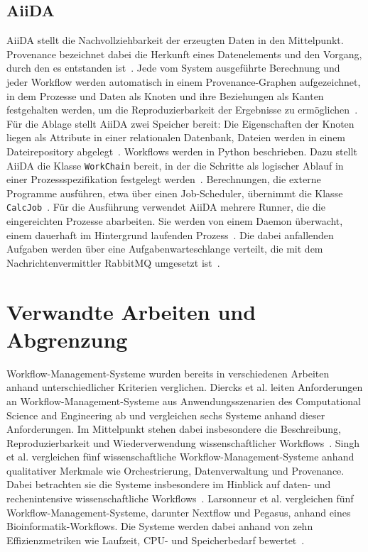 \subsection{AiiDA}
\label{sec:basics:aiida}
AiiDA stellt die Nachvollziehbarkeit der erzeugten Daten in den
Mittelpunkt. Provenance bezeichnet dabei die Herkunft eines
Datenelements und den Vorgang, durch den es entstanden
ist~\cite[S.~316]{buneman2001provenance}. Jede vom System
ausgeführte Berechnung und jeder Workflow werden automatisch in
einem Provenance-Graphen aufgezeichnet, in dem Prozesse und Daten
als Knoten und ihre Beziehungen als Kanten festgehalten werden, um
die Reproduzierbarkeit der Ergebnisse zu
ermöglichen~\cite[S.~2]{huber2020aiida}. Für die Ablage stellt
AiiDA zwei Speicher bereit: Die Eigenschaften der Knoten liegen
als Attribute in einer relationalen Datenbank, Dateien werden in
einem Dateirepository abgelegt~\cite[S.~8]{huber2020aiida}.
Workflows werden in Python beschrieben. Dazu stellt AiiDA die
Klasse \texttt{WorkChain} bereit, in der die Schritte als
logischer Ablauf in einer Prozessspezifikation festgelegt
werden~\cite[S.~4\,f.]{huber2020aiida}. Berechnungen, die externe
Programme ausführen, etwa über einen Job-Scheduler, übernimmt die
Klasse \texttt{CalcJob}~\cite[S.~4]{huber2020aiida}.
Für die Ausführung verwendet AiiDA mehrere Runner, die die
eingereichten Prozesse abarbeiten. Sie werden von einem Daemon
überwacht, einem dauerhaft im Hintergrund laufenden
Prozess~\cite[S.~3]{huber2020aiida}. Die dabei
anfallenden Aufgaben werden über eine Aufgabenwarteschlange
verteilt, die mit dem Nachrichtenvermittler RabbitMQ umgesetzt
ist~\cite[S.~3]{huber2020aiida}.

\section{Verwandte Arbeiten und Abgrenzung}
\label{sec:basics:related}
Workflow-Management-Systeme wurden bereits in verschiedenen
Arbeiten anhand unterschiedlicher Kriterien verglichen.
Diercks et al. leiten Anforderungen an Workflow-Management-Systeme
aus Anwendungsszenarien des Computational Science and Engineering
ab und vergleichen sechs Systeme anhand dieser Anforderungen.
Im Mittelpunkt stehen dabei insbesondere die Beschreibung,
Reproduzierbarkeit und Wiederverwendung wissenschaftlicher
Workflows~\cite[S.~1]{diercks2023evaluation}.
Singh et al. vergleichen fünf wissenschaftliche
Workflow-Management-Systeme anhand qualitativer Merkmale wie
Orchestrierung, Datenverwaltung und Provenance.
Dabei betrachten sie die Systeme insbesondere im Hinblick auf
daten- und rechenintensive wissenschaftliche
Workflows~\cite[S.~4553]{singh2019evaluating}.
Larsonneur et al. vergleichen fünf Workflow-Management-Systeme,
darunter Nextflow und Pegasus, anhand eines
Bioinformatik-Workflows. Die Systeme werden dabei anhand von
zehn Effizienzmetriken wie Laufzeit, CPU- und Speicherbedarf
bewertet~\cite[S.~2773\,f.]{larsonneur2018evaluating}.

